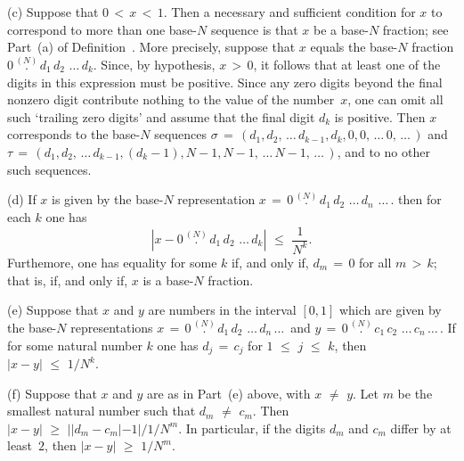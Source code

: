 \V

        (c) Suppose that $0\,<\,x\,<\,1$. Then a necessary and sufficient condition
    for $x$ to correspond to more than one base-$N$ sequence is that $x$ be a base-$N$ fraction; see Part~(a) of Definition~.
    More precisely, suppose that $x$ equals the base-$N$ fraction $0\,\stackrel{(N)}{.}\,d_{1}\,d_{2}\,\,{\ldots}\,d_{k}$.
    Since, by hypothesis, $x\,>\,0$, it follows that at least one of the digits in this expression must be positive.
    Since any zero digits beyond the final nonzero digit contribute nothing to the value of the number~$x$,
    one can omit all such `trailing zero digits' and assume that the final digit $d_{k}$ is positive.
    Then $x$ corresponds to the base-$N$ sequences ${\sigma} \,=\, (d_{1}, d_{2},\,{\ldots}\, d_{k-1}, d_{k}, 0, 0,\,{\ldots}\,0, \,{\ldots}\,)$
    and ${\tau} \,=\, (d_{1}, d_{2}, \,{\ldots}\, d_{k-1}, (d_{k}-1),N-1, N-1, \,{\ldots}\,N-1, \,{\ldots}\,)$, and to no other such sequences.

\V

        (d) If $x$ is given by the base-$N$ representation $x \,=\, 0\,\stackrel{(N)}{.}\,d_{1}\,d_{2}\,\,{\ldots}\,d_{n}\,\,{\ldots}\,$.
    then for each $k$ one has
        \begin{displaymath}
        |x - 0\,\stackrel{(N)}{.}\,d_{1}\,d_{2}\,\,{\ldots}\,d_{k}|\,\,{\leq}\,\,\frac{1}{N^{k}}.
        \end{displaymath}
    Furthemore, one has equality for some $k$ if, and only if, $d_{m} \,=\, 0$ for all $m\,>\,k$; that is, if, and only if, $x$ is a base-$N$ fraction.

\V

        (e) Suppose that $x$ and $y$ are numbers in the interval $[0,1]$ which are given by the base-$N$ representations
    $x \,=\, 0\,\stackrel{(N)}{.}\,d_{1}\,d_{2}\,\,{\ldots}\,d_{n}\,{\ldots}\,$ and
    $y \,=\, 0\,\stackrel{(N)}{.}\,c_{1}\,c_{2}\,\,{\ldots}\,c_{n}\,{\ldots}\,$.
    If for some natural number $k$ one has $d_{j} \,=\, c_{j}$ for $1\,\,{\leq}\,\,j\,\,{\leq}\,\,k$, then $|x-y|\,\,{\leq}\,\,1/N^{k}$.

\V

        (f) Suppose that $x$ and $y$ are as in Part~(e) above, with $x \,\,{\neq}\,\, y$.
    Let $m$ be the smallest natural number such that $d_{m} \,\,{\neq}\,\, c_{m}$.
    Then $|x-y|\,\,{\geq}\,\,||d_{m}-c_{m}| - 1|/1/N^{m}$. In particular, if the digits $d_{m}$ and $c_{m}$ differ by at least~$2$,
    then $|x-y|\,\,{\geq}\,\,1/N^{m}$.

